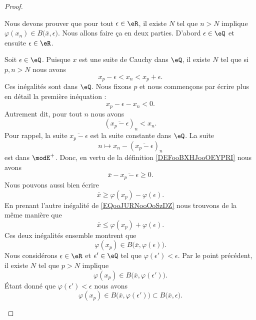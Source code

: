 \begin{proof}
\begin{subproof}
		Nous devons prouver que pour tout \( \epsilon\in \eR\), il existe \( N\) tel que \( n>N\) implique \( \varphi(x_n)\in B\big( \bar x,\epsilon \big)\). Nous allons faire ça en deux parties. D'abord \( \epsilon\in \eQ\) et ensuite \( \epsilon\in \eR\).
		\begin{subproof}
			Soit \( \epsilon\in \eQ\). Puisque \( x\) est une suite de Cauchy dans \( \eQ\), il existe \( N\) tel que si \( p,n>N\) nous avons
			\begin{equation}        \label{EQooJURNooOoSzDZ}
				x_p-\epsilon<x_n<x_p+\epsilon.
			\end{equation}
			Ces inégalités sont dans \( \eQ\). Nous fixons \( p\) et nous commençons par écrire plus en détail la première inéquation :
			\begin{equation}
				x_p-\epsilon-x_n<0.
			\end{equation}
			Autrement dit, pour tout \( n\) nous avons
			\begin{equation}
				(\overline{ x_p-\epsilon })_n<x_n.
			\end{equation}
			Pour rappel, la suite \(  \overline{ x_p-\epsilon } \) est la suite constante dans \( \eQ\). La suite
			\begin{equation}
				n\mapsto x_n-(\overline{ x_p-\epsilon })_n
			\end{equation}
			est dans \( \modE^+\). Donc, en vertu de la définition \ref{DEFooBXHJooOEYPRI} nous avons
			\begin{equation}
				\bar x-\overline{ x_p-\epsilon }\geq 0.
			\end{equation}
			Nous pouvons aussi bien écrire
			\begin{equation}
				\bar x\geq \varphi(x_p)-\varphi(\epsilon).
			\end{equation}
			En prenant l'autre inégalité de \eqref{EQooJURNooOoSzDZ} nous trouvons de la même manière que
			\begin{equation}
				\bar x\leq \varphi(x_p)+\varphi(\epsilon).
			\end{equation}
			Ces deux inégalités ensemble montrent que
			\begin{equation}
				\varphi(x_p)\in B\big( \bar x,\varphi(\epsilon) \big).
			\end{equation}
			Nous considérons \( \epsilon\in \eR\) et \( \epsilon'\in \eQ\) tel que \( \varphi(\epsilon')<\epsilon\). Par le point précédent, il existe \( N\) tel que \( p>N\) implique
			\begin{equation}
				\varphi(x_p)\in B\big( \bar x,\varphi(\epsilon') \big).
			\end{equation}
			Étant donné que \( \varphi(\epsilon')<\epsilon\) nous avons
			\begin{equation}
				\varphi(x_p)\in B\big( \bar x,\varphi(\epsilon') \big)\subset B\big( \bar x,\epsilon \big).
			\end{equation}
		\end{subproof}
	\end{subproof}
\end{proof}

